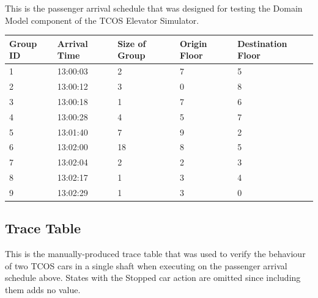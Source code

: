 \documentclass{UoYCSproject}
\begin{document}
\begin{appendices}
This is the passenger arrival schedule that was designed for testing the Domain Model component of the TCOS Elevator Simulator.

\begin{tabular}{l | l | l | l | l}
	Group ID & Arrival Time & Size of Group & Origin Floor & Destination Floor \\
	\hline
	1 & 13:00:03 & 2 & 7 & 5 \\
	2 & 13:00:12 & 3 & 0 & 8 \\
	3 & 13:00:18 & 1 & 7 & 6 \\
	4 & 13:00:28 & 4 & 5 & 7 \\
	5 & 13:01:40 & 7 & 9 & 2 \\
	6 & 13:02:00 & 18 & 8 & 5 \\
	7 & 13:02:04 & 2 & 2 & 3 \\
	8 & 13:02:17 & 1 & 3 & 4 \\
	9 & 13:02:29 & 1 & 3 & 0
\end{tabular}

\begin{landscape}

\subsection{Trace Table}

This is the manually-produced trace table that was used to verify the behaviour of two TCOS cars in a single shaft when executing on the passenger arrival schedule above.  States with the Stopped car action are omitted since including them adds no value.


\end{landscape}
\end{appendices}
\end{document}
